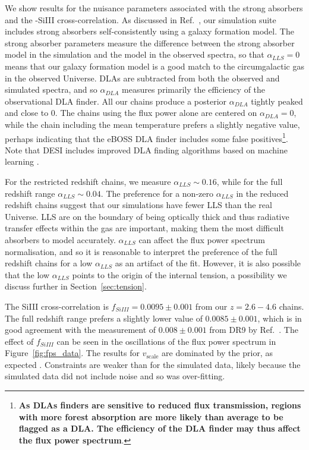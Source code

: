 We show results for the nuisance parameters associated with the strong absorbers and the \Lya-SiIII cross-correlation.
As discussed in Ref.~\cite{2023simsuite}, our simulation suite includes strong absorbers self-consistently using a galaxy formation model.
The strong absorber parameters measure the difference between the strong absorber model in the simulation and the model in the observed spectra, so that $\alpha_{LLS} = 0$ means that our galaxy formation model is a good match to the circumgalactic gas in the observed Universe.
DLAs are subtracted from both the observed and simulated spectra, and so $\alpha_{DLA}$ measures primarily the efficiency of the observational DLA finder. 
All our chains produce a posterior $\alpha_{DLA}$ tightly peaked and close to $0$.
The chains using the flux power alone are centered on $\alpha_{DLA} = 0$, while the chain including the mean temperature prefers a slightly negative value, perhaps indicating that the eBOSS DLA finder includes some false positives\footnote{\textbf{As DLAs finders are sensitive to reduced flux transmission, regions with more \Lya forest absorption are more likely than average to be flagged as a DLA. The efficiency of the DLA finder may thus affect the flux power spectrum}.}.
Note that DESI includes improved DLA finding algorithms based on machine learning \cite{Ho:2020,Parks:2018, 2022arXiv220100827W}.

For the restricted redshift chains, we measure $\alpha_{LLS} \sim 0.16$, while for the full redshift range $\alpha_{LLS} \sim 0.04$.
The preference for a non-zero $\alpha_{LLS}$ in the reduced redshift chains suggest that our simulations have fewer LLS than the real Universe.
LLS are on the boundary of being optically thick and thus radiative transfer effects within the gas are important, making them the most difficult absorbers to model accurately.
$\alpha_{LLS}$ can affect the flux power spectrum normalisation, and so it is reasonable to interpret the preference of the full redshift chains for a low $\alpha_{LLS}$ as an artifact of the fit.
However, it is also possible that the low $\alpha_{LLS}$ points to the origin of the internal tension, a possibility we discuss further in Section~\ref{sec:tension}. 

The SiIII cross-correlation is $f_{SiIII} = 0.0095 \pm 0.001$ from our $z=2.6 - 4.6$ chains.
The full redshift range prefers a slightly lower value of $0.0085 \pm 0.001$, which is in good agreement with the measurement of $0.008 \pm 0.001$ from DR9 by Ref.~\cite{2013A&A...559A..85P}.
The effect of $f_{SiIII}$ can be seen in the oscillations of the flux power spectrum in Figure~\ref{fig:fps_data}.
The results for $v_\mathrm{scale}$ are dominated by the prior, as expected \cite{2015JCAP...11..011P, 2020JCAP...04..038P}.
Constraints are weaker than for the simulated data, likely because the simulated data did not include noise and so was over-fitting.

